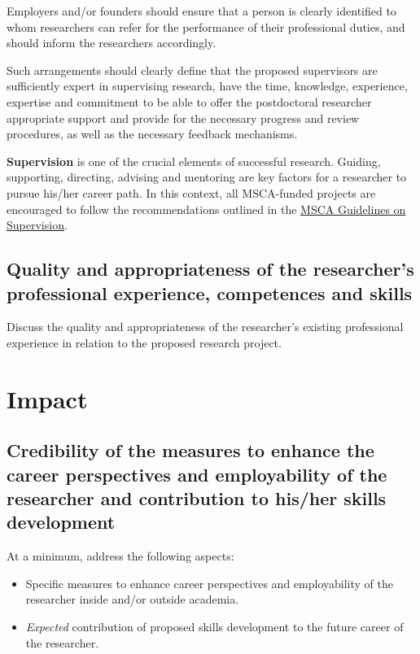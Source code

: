 \documentclass[11pt,draftproposal]{msca-pf}
\begin{document}
Employers and/or founders should ensure that a person is clearly identified to
whom researchers can refer for the performance of their professional duties, and
should inform the researchers accordingly.

Such arrangements should clearly define that the proposed supervisors are
sufficiently expert in supervising research, have the time, knowledge, experience,
expertise and commitment to be able to offer the postdoctoral researcher
appropriate support and provide for the necessary progress and review procedures,
as well as the necessary feedback mechanisms.

\textbf{Supervision} is one of the crucial elements of successful research. Guiding,
supporting, directing, advising and mentoring are key factors for a researcher
to pursue his/her career path. In this context, all MSCA-funded projects are
encouraged to follow the recommendations outlined in the
\href{https://data.europa.eu/doi/10.2766/508311}{MSCA Guidelines on Supervision}\footnotemark{}.


\subsection{Quality and appropriateness of the researcher's professional
experience, competences and skills}

Discuss the quality and appropriateness of the researcher’s existing professional
experience in relation to the proposed research project.

\section{Impact }
\label{IMP-ACT-IA}

\subsection{Credibility of the measures to enhance the career perspectives
and employability of the researcher and contribution to his/her skills
development}

At a minimum, address the following aspects:

\begin{itemize}
    \item Specific measures to enhance career perspectives and employability of
    the researcher inside and/or outside academia.
    \item \emph{Expected} contribution of proposed skills development to the
    future career of the researcher.
\end{itemize}
\end{document}
